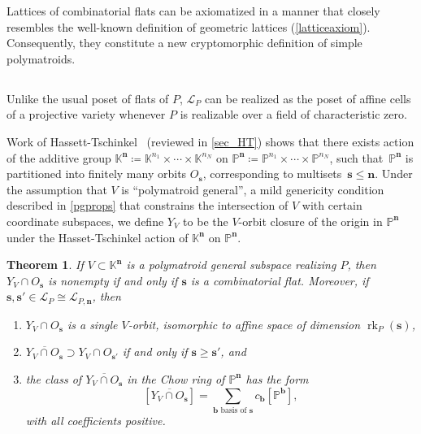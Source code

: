 \documentclass[11pt]{article}
\newtheorem{theo}{Theorem}[section]
\theoremstyle{definition}
\numberwithin{equation}{section}
\renewcommand{\P}{\mathbb{P}}
\newcommand{\K}{\mathbb{K}}
\DeclareMathOperator{\rk}{rk}
\newcommand{\revision}[1]{{#1}}
\begin{document}
\revision{Lattices of combinatorial flats can be axiomatized in a manner that closely resembles the well-known definition of geometric lattices (\cref{latticeaxiom}). Consequently, they constitute a new cryptomorphic definition of simple polymatroids.}

\subsection{} Unlike the usual poset of flats of $P$, $\mathcal L_P$ can be realized as the poset of affine cells of a projective variety whenever $P$ is realizable \revision{over a field of characteristic zero}. 

Work of Hassett-Tschinkel~\cite{HT99} (reviewed in \cref{sec_HT}) shows that there exists action of the additive group $\K^{\mathbf n} \coloneqq \K^{n_1} \times \cdots \times \K^{n_N}$ on $\P^{\mathbf n} \coloneqq \P^{n_1} \times \cdots \times \P^{n_N}$, such that~$\P^{\mathbf n}$ is partitioned into finitely many orbits $O_{\mathbf s}$, corresponding to multisets~$\mathbf s \leq \mathbf n$.
Under the assumption that $V$ is ``polymatroid general'', a mild genericity condition described in \cref{pgprops} that constrains the intersection of $V$ with certain coordinate subspaces, we define $Y_V$ to be the $V$-orbit closure of the origin in $\P^{\mathbf n}$ under the Hasset-Tschinkel action of $\K^{\mathbf n}$ on $\P^{\mathbf{n}}.$
\begin{theo}\label{main:stratification}
  If $V \subset \K^{\mathbf n}$ is a polymatroid general subspace realizing $P$, then $Y_V \cap O_{\mathbf s}$ is nonempty if and only if $\mathbf s$ is a combinatorial flat.
  Moreover, if $\mathbf s, \mathbf s' \in \mathcal L_P \cong \mathcal L_{P, \mathbf n}$, then
  \begin{enumerate}
  \item \label{main:stratification:orbit} $Y_V \cap O_{\mathbf s}$ is a single $V$-orbit, isomorphic to affine space of dimension $\rk_P(\mathbf s)$,
  \item \label{main:stratification:poset} $\overline{Y_V \cap O_{\mathbf s}} \supset Y_V \cap O_{\mathbf s'}$ if and only if $\mathbf s \geq \mathbf s'$, and
  \item \label{main:stratification:class} the class of $\overline{Y_V \cap O_{\mathbf s}}$ in the Chow ring of $\P^{\mathbf n}$ has the form
    \[
      [\overline{Y_V \cap O_{\mathbf s}}] = \sum_{\mathbf b \text{ basis of $\mathbf s$}} c_{\mathbf b} [\P^{\mathbf b}],
    \]
    with all coefficients positive.
  \end{enumerate}
\end{theo}
\end{document}
